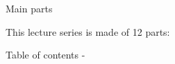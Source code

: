 %
%


\begin{frame}[t]{Main parts}

This lecture series is made of 12 parts:
\setcounter{tocdepth}{1}
\tableofcontents
\end{frame}


\begin{frame}[allowframebreaks,t]{Table of contents -}

\setcounter{tocdepth}{2}
\tableofcontents

\end{frame}

